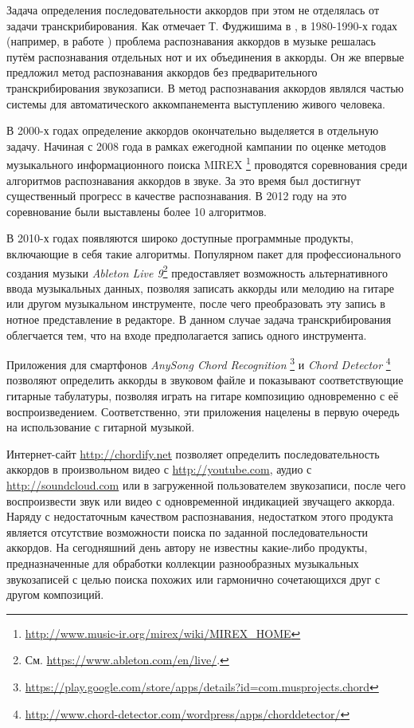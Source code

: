 Задача определения последовательности аккордов при этом не отделялась от задачи
транскрибирования. Как отмечает Т. Фуджишима в \cite{Fujishima1999},
в 1980-1990-х годах (например, в работе \cite{Aono1998}) проблема распознавания
аккордов в музыке решалась путём распознавания отдельных нот и их объединения в
аккорды. Он же впервые предложил метод распознавания аккордов без
предварительного транскрибирования звукозаписи. В \cite{Aono1998} метод
распознавания аккордов являлся частью системы для автоматического
аккомпанемента выступлению живого человека.

В 2000-х годах определение аккордов окончательно выделяется в отдельную задачу.
Начиная с 2008 года в рамках ежегодной кампании по оценке методов музыкального
информационного поиска MIREX
\footnote{\url{http://www.music-ir.org/mirex/wiki/MIREX_HOME}} проводятся
соревнования среди алгоритмов распознавания аккордов в звуке. За это время был
достигнут существенный прогресс в качестве распознавания. В 2012 году на это
соревнование были выставлены более 10 алгоритмов.

В 2010-х годах появляются широко доступные программные продукты, включающие в
себя такие алгоритмы. Популярном пакет для профессионального создания музыки
\emph{Ableton Live 9}\footnote{См. \url{https://www.ableton.com/en/live/}.}
предоставляет возможность альтернативного ввода музыкальных данных, позволяя
записать аккорды или мелодию на гитаре или другом музыкальном инструменте,
после чего преобразовать эту запись в нотное представление в редакторе. В
данном случае задача транскрибирования облегчается тем, что на входе
предполагается запись одного инструмента.

Приложения для смартфонов \emph{AnySong Chord Recognition} \footnote{
\url{https://play.google.com/store/apps/details?id=com.musprojects.chord}} и
\emph{Chord Detector} \footnote{
\url{http://www.chord-detector.com/wordpress/apps/chorddetector/}} позволяют
определить аккорды в звуковом файле и показывают соответствующие гитарные
табулатуры, позволяя играть на гитаре композицию одновременно с её
воспроизведением. Соответственно, эти приложения нацелены в первую очередь на
использование с гитарной музыкой.

Интернет-сайт \url{http://chordify.net} позволяет определить последовательность
аккордов в произвольном видео с \url{http://youtube.com}, аудио с
\url{http://soundcloud.com} или в загруженной пользователем звукозаписи, после
чего воспроизвести звук или видео с одновременной индикацией звучащего аккорда.
Наряду с недостаточным качеством распознавания, недостатком этого продукта
является отсутствие возможности поиска по заданной последовательности аккордов.
На сегодняшний день автору не известны какие-либо продукты, предназначенные для
обработки коллекции разнообразных музыкальных звукозаписей с целью поиска
похожих или гармонично сочетающихся друг с другом композиций.

